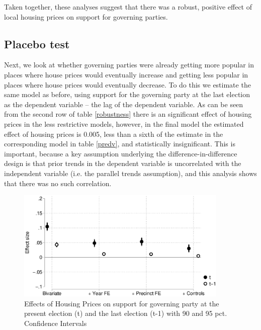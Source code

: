 \documentclass[12pt,a4paper]{article}
\begin{document}
Taken together, these analyses suggest that there was a robust, positive effect of local housing prices on support for governing parties.

\subsection{Placebo test}
Next, we look at whether  governing parties were already getting more popular in places where house prices would eventually increase and getting less popular in places where house prices would eventually decrease. To do this we estimate the same model as before, using support for the governing party at the last election as the dependent variable -- the lag of the dependent variable. As can be seen from the second row of table \ref{robustness} there is an significant effect of housing prices in the less restrictive models, however, in the final model the estimated effect of housing prices is 0.005, less than a sixth of the estimate in the corresponding model in table \ref{predv}, and statistically insignificant. This is important, because a key assumption underlying the difference-in-difference design is that prior trends in the dependent variable is uncorrelated with the independent variable  (i.e. the parallel trends assumption), and this analysis shows that there was no such correlation.

\begin{figure}[htbp!]
	\includegraphics[width=0.9\textwidth]{../figures/lagdv.eps}
	\centering
	\caption{Effects of Housing Prices on support for governing party at the present election (t) and the last election (t-1) with 90  and 95 pct. Confidence Intervals}\label{placebo}
\end{figure}
\end{document}
